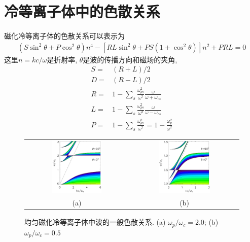 \documentclass{article}
\begin{document}
	\section{冷等离子体中的色散关系}	
	磁化冷等离子体的色散关系可以表示为\citep{Diver2001}
	\begin{align}
		\left(S \sin^2 \theta + P \cos^2 \theta\right) n^4 - \left[R L \sin^2 \theta
		+ P S \left(1 + \cos^2 \theta\right) \right] n^2 + P R L= 0 \label{Eqn:Colp}
	\end{align}
	这里$n = k c / \omega$是折射率, $\theta$是波的传播方向和磁场的夹角,
	\begin{align*}
		S =& (R + L) / 2
		\\
		D =& (R - L) / 2
		\\
		R =& 1 - \sum_s \frac{\omega_{ps}^2}{\omega^2} \frac{\omega}{\omega + \omega_{cs}}
		\\
		L =& 1 - \sum_s \frac{\omega_{ps}^2}{\omega^2} \frac{\omega}{\omega - \omega_{cs}}
		\\
		P =& 1 - \sum_s \frac{\omega_{ps}^2}{\omega^2}  = 1 - \frac{\omega_p^2}{\omega^2}
	\end{align*}
	
	\begin{figure}[htb]
		\begin{tabular}{cc}
			\includegraphics[width=0.5\textwidth]{figure2_1.eps} &
			\includegraphics[width=0.5\textwidth]{figure2_2.eps}
			\\
			(a) & (b)
		\end{tabular}
		\caption{均匀磁化冷等离子体中波的一般色散关系. (a) $\omega_p / \omega_c = 2.0$; (b) $\omega_p / \omega_c = 0.5$} \label{ColdPlasma}
	\end{figure}
	
\end{document}
